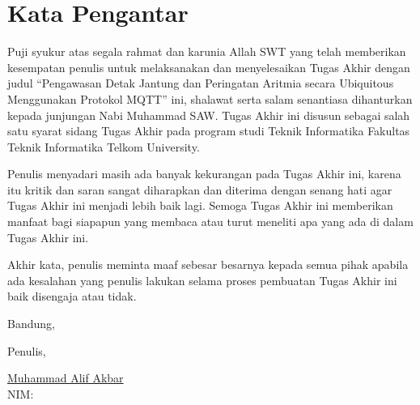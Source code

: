 \chapter*{Kata Pengantar}

Puji syukur atas segala rahmat dan karunia Allah SWT yang telah
memberikan kesempatan penulis untuk melaksanakan dan menyelesaikan Tugas Akhir dengan judul “Pengawasan Detak Jantung dan Peringatan Aritmia secara Ubiquitous Menggunakan Protokol MQTT” ini, shalawat serta salam senantiasa dihanturkan kepada junjungan Nabi Muhammad SAW. Tugas Akhir ini disusun sebagai salah satu syarat sidang Tugas Akhir pada program studi Teknik Informatika Fakultas Teknik Informatika Telkom University.

Penulis menyadari masih ada banyak kekurangan pada Tugas Akhir ini, karena itu kritik dan saran sangat diharapkan dan diterima dengan senang hati agar Tugas Akhir ini menjadi lebih baik lagi. Semoga Tugas Akhir ini memberikan manfaat bagi siapapun yang membaca atau turut meneliti apa yang ada di dalam Tugas Akhir ini.

Akhir kata, penulis meminta maaf sebesar besarnya kepada semua pihak
apabila ada kesalahan yang penulis lakukan selama proses pembuatan Tugas Akhir ini baik disengaja atau tidak.

\vspace{0.5cm}

\begin{flushleft}
{Bandung, \Tanggal\quad \Bulan \quad \Date}\\
\vspace{0.5cm}

Penulis,\\
\vspace{2cm}

\underline{Muhammad Alif Akbar} \\ 
NIM: \NIM
\end{flushleft}
